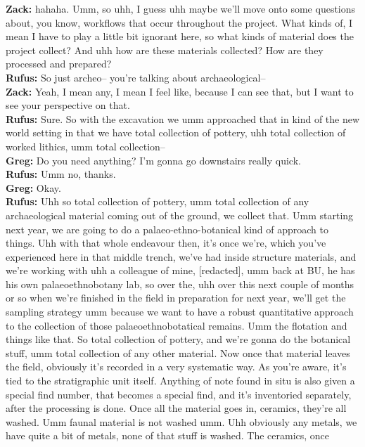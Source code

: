 \documentclass[
  canadian,
]{article}
\begin{document}
\textbf{Zack:} hahaha. Umm, so uhh, I guess uhh maybe we'll move onto
some questions about, you know, workflows that occur throughout the
project. What kinds of, I mean I have to play a little bit ignorant
here, so what kinds of material does the project collect? And uhh how
are these materials collected? How are they processed and prepared?\\
\textbf{Rufus:} So just archeo-- you're talking about archaeological--\\
\textbf{Zack:} Yeah, I mean any, I mean I feel like, because I can see
that, but I want to see your perspective on that.\\
\textbf{Rufus:} Sure. So with the excavation we umm approached that in
kind of the new world setting in that we have total collection of
pottery, uhh total collection of worked lithics, umm total
collection--\\
\textbf{Greg:} Do you need anything? I'm gonna go downstairs really
quick.\\
\textbf{Rufus:} Umm no, thanks.\\
\textbf{Greg:} Okay.\\
\textbf{Rufus:} Uhh so total collection of pottery, umm total collection
of any archaeological material coming out of the ground, we collect
that. Umm starting next year, we are going to do a
palaeo-ethno-botanical kind of approach to things. Uhh with that whole
endeavour then, it's once we're, which you've experienced here in that
middle trench, we've had inside structure materials, and we're working
with uhh a colleague of mine, {[}redacted{]}, umm back at BU, he has his
own palaeoethnobotany lab, so over the, uhh over this next couple of
months or so when we're finished in the field in preparation for next
year, we'll get the sampling strategy umm because we want to have a
robust quantitative approach to the collection of those
palaeoethnobotatical remains. Umm the flotation and things like that. So
total collection of pottery, and we're gonna do the botanical stuff, umm
total collection of any other material. Now once that material leaves
the field, obviously it's recorded in a very systematic way. As you're
aware, it's tied to the stratigraphic unit itself. Anything of note
found in situ is also given a special find number, that becomes a
special find, and it's inventoried separately, after the processing is
done. Once all the material goes in, ceramics, they're all washed. Umm
faunal material is not washed umm. Uhh obviously any metals, we have
quite a bit of metals, none of that stuff is washed. The ceramics, once
\end{document}
